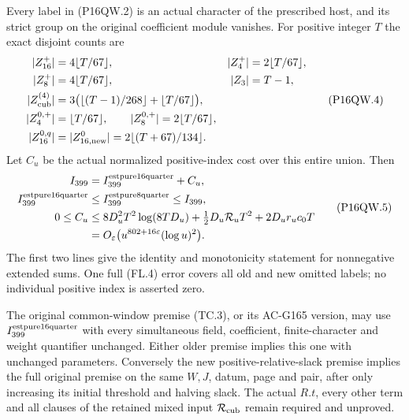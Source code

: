 \begin{theorem}
\label{AC-G167-window}
Every label in (P16QW.2) is an actual character of the prescribed
host, and its strict group on the original coefficient module
vanishes.  For positive integer $T$ the exact disjoint counts are
\[
 \begin{aligned}
 |Z_{16}^+|&=4\lfloor T/67\rfloor,& |Z_4^+|&=2\lfloor T/67\rfloor,\\
 |Z_8^+|&=4\lfloor T/67\rfloor,& |Z_3|&=T-1,\\
 |Z_{\rm cub}^{(4)}|&=3\bigl(\lfloor(T-1)/268\rfloor
                                      +\lfloor T/67\rfloor\bigr),\\
 |Z_4^{0,+}|&=\lfloor T/67\rfloor,\qquad
 |Z_8^{0,+}|=2\lfloor T/67\rfloor,\\
 |Z_{16}^{0,q}|&=|Z_{16,\mathrm{new}}^0|=2\lfloor(T+67)/134\rfloor.
 \end{aligned}
 \tag{P16QW.4}
\]
Let $C_u$ be the actual normalized positive-index cost over
this entire union.  Then
\[
 \begin{aligned}
 I_{399}&=I_{399}^{\rm estpure16quarter}+C_u,\\
 I_{399}^{\rm estpure16quarter}&\leq I_{399}^{\rm estpure8quarter}\leq I_{399},\\
 0\leq C_u&\leq8D_u^2T^2\log(8TD_u)
                   +\tfrac12D_u\mathcal R_uT^2+2D_ur_uc_0T\\
 &=O_\varepsilon\bigl(u^{802+16\varepsilon}(\log u)^2\bigr).
 \end{aligned}
 \tag{P16QW.5}
\]
The first two lines give the identity and monotonicity statement for
nonnegative extended sums.
One full (FL.4) error covers all old and new omitted labels;
no individual positive index is asserted zero.

The original common-window premise (TC.3), or its AC-G165 version,
may use $I_{399}^{\rm estpure16quarter}$ with every simultaneous field,
coefficient, finite-character and weight quantifier unchanged.
Either older premise implies this one with unchanged parameters.
Conversely the new positive-relative-slack premise implies the
full original premise on the same $W,J$, datum, page and pair,
after only increasing its initial threshold and halving slack.
The actual $R.t$, every other term and all clauses of the retained
mixed input $\mathcal R_{\rm cub}$ remain required and unproved.
\end{theorem}

